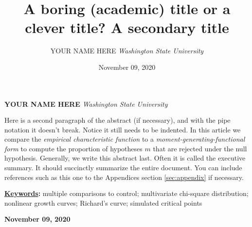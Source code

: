 \documentclass[]{article}
\title{\textbf{\textcolor{WSU.crimson}{A boring (academic) title or a
clever title?}} \newline \textbf{\textcolor{WSU.gray}{A secondary
title}}  }
\author{\Large YOUR NAME
HERE\vspace{0.05in} \newline\normalsize\emph{Washington State
University}  }
\date{November 09, 2020}
\newcommand*{\authorfont}{\fontfamily{phv}\selectfont}
\renewenvironment{abstract}
 {{%
    \setlength{\leftmargin}{0mm}
    \setlength{\rightmargin}{\leftmargin}%
  }%
  \relax}
 {\endlist}
\begin{document}
	
%    


{%
\setlength{\parindent}{0pt}
\thispagestyle{plain}
{\fontsize{18}{20}\selectfont\raggedright 
\maketitle  %

}

{
   \vskip 13.5pt\relax \normalsize\fontsize{11}{12} 
   
\textbf{\authorfont YOUR NAME HERE} \hskip 15pt \emph{\small Washington
State University}   

}

}








\begin{abstract}

    \hbox{\vrule height .2pt width 39.14pc}

    \vskip 8.5pt %

\noindent \noindent Here is a second paragraph of the abstract (if
necessary), and with the pipe notation it doesn't break. Notice it still
needs to be indented. \vspace{0.25in} In this article we compare the
\emph{empirical characteristic function} \citep{Tukey:1977, Becker:1988}
to a \emph{moment-generating-functional form} to compute the proportion
of hypotheses \(m\) that are rejected under the null hypothesis.
\vspace{0.25in} \noindent Generally, we write this abstract last. Often
it is called the executive summary. It should succinctly summarize the
entire document. You can include references such as this one to the
Appendices section \ref{sec:appendix} if necessary.


\vskip 8.5pt \noindent \textbf{\underline{Keywords}:} multiple
comparisons to control; multivariate chi-square distribution; nonlinear
growth curves; Richard's curve; simulated critical points \par

    




    
    \hbox{\vrule height .2pt width 39.14pc}
    \vskip 5pt 
    \hfill \textbf{\textcolor{WSU.gray}{ November 09, 2020 } }
    \vskip 5pt 
    
\end{abstract}
\end{document}
